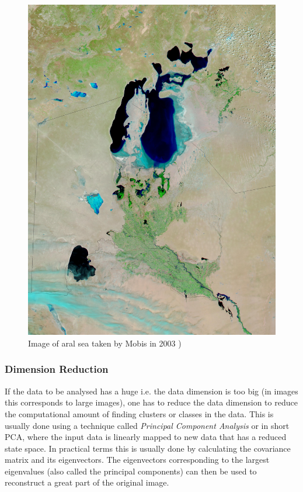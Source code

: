 \begin{figure}[H]
	\centering
	\includegraphics[scale=0.05]{images/aralsee250mperpixel.jpg}
	\caption{Image of aral sea taken by Mobis in 2003 \protect\footnotemark)  }
	\label{fig:kmeans}
\end{figure}




\subsubsection{Dimension Reduction}
If the data to be analysed has a huge i.e. the data dimension is too big (in images this corresponds to large images), one has to reduce the data dimension to reduce the computational amount of finding clusters or classes in the data. This is usually done using a technique called \textit{Principal Component Analysis} or in short PCA, where the input data is linearly mapped to new data that has a reduced state space. In practical terms this is usually done by calculating the covariance matrix and its eigenvectors. The eigenvectors corresponding to the largest eigenvalues (also called the principal components) can then be used to reconstruct a great part of the original image.


